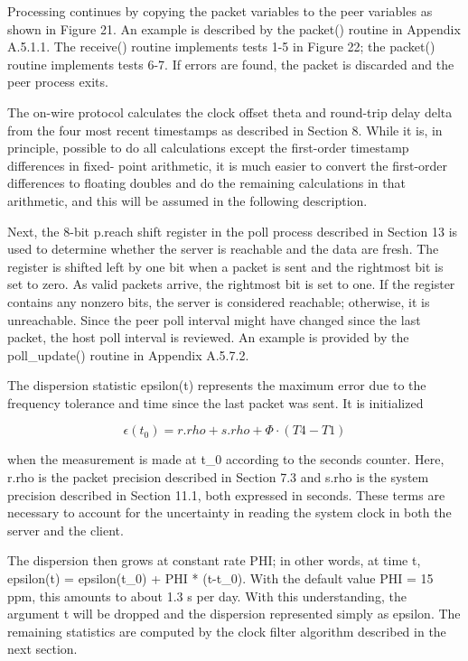 Processing continues by copying the packet variables to the peer
variables as shown in Figure 21. An example is described by the
packet() routine in Appendix A.5.1.1. The receive() routine
implements tests 1-5 in Figure 22; the packet() routine implements
tests 6-7. If errors are found, the packet is discarded and the peer
process exits.

The on-wire protocol calculates the clock offset theta and round-trip
delay delta from the four most recent timestamps as described in
Section 8. While it is, in principle, possible to do all
calculations except the first-order timestamp differences in fixed-
point arithmetic, it is much easier to convert the first-order
differences to floating doubles and do the remaining calculations in
that arithmetic, and this will be assumed in the following
description.

Next, the 8-bit p.reach shift register in the poll process described
in Section 13 is used to determine whether the server is reachable
and the data are fresh. The register is shifted left by one bit when
a packet is sent and the rightmost bit is set to zero. As valid
packets arrive, the rightmost bit is set to one. If the register
contains any nonzero bits, the server is considered reachable;
otherwise, it is unreachable. Since the peer poll interval might
have changed since the last packet, the host poll interval is
reviewed. An example is provided by the poll\_update() routine in
Appendix A.5.7.2.

The dispersion statistic epsilon(t) represents the maximum error due
to the frequency tolerance and time since the last packet was sent.
It is initialized

$$
\epsilon(t_0) = r.rho + s.rho + \Phi \cdot (T4 - T1)
$$

when the measurement is made at t\_0 according to the seconds counter.
Here, r.rho is the packet precision described in Section 7.3 and
s.rho is the system precision described in Section 11.1, both
expressed in seconds. These terms are necessary to account for the
uncertainty in reading the system clock in both the server and the
client.

The dispersion then grows at constant rate PHI; in other words, at
time t, epsilon(t) = epsilon(t\_0) + PHI * (t-t\_0). With the default
value PHI = 15 ppm, this amounts to about 1.3 s per day. With this
understanding, the argument t will be dropped and the dispersion
represented simply as epsilon. The remaining statistics are computed
by the clock filter algorithm described in the next section.
